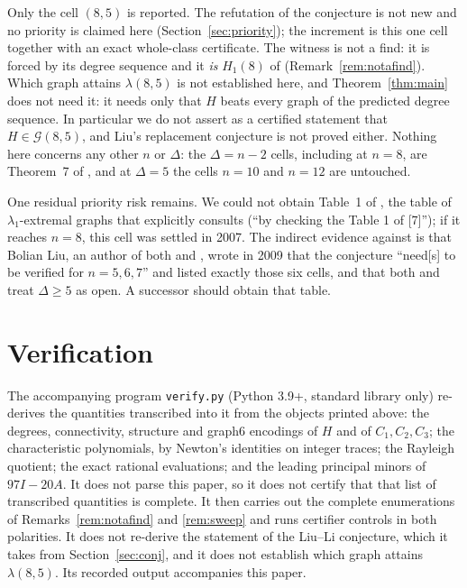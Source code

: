 \documentclass[11pt]{amsart}
\theoremstyle{definition}
\begin{document}
Only the cell $(8,5)$ is reported. The refutation of the conjecture is not new
and no priority is claimed here (Section~\ref{sec:priority}); the increment is
this one cell together with an exact whole-class certificate. The witness is not
a find: it is forced by its degree sequence and it \emph{is} $H_1(8)$ of
\cite{HLY} (Remark~\ref{rem:notafind}). Which graph attains $\lambda(8,5)$ is
not established here, and Theorem~\ref{thm:main} does not need it: it needs only
that $H$ beats every graph of the predicted degree sequence. In particular we do
not assert as a certified statement that $H\in\mathcal{G}(8,5)$, and Liu's
replacement conjecture is not proved either. Nothing here concerns any other $n$
or $\Delta$: the $\Delta=n-2$ cells, including at $n=8$, are Theorem~7 of
\cite{HLY}, and at $\Delta=5$ the cells $n=10$ and $n=12$ are untouched.

One residual priority risk remains. We could not obtain Table~1 of
\cite{LSW2007}, the table of $\lambda_1$-extremal graphs that \cite{LiuLi}
explicitly consults (``by checking the Table 1 of [7]''); if it reaches $n=8$,
this cell was settled in 2007. The indirect evidence against is that Bolian Liu,
an author of both \cite{LiuLi} and \cite{LHY2009}, wrote in 2009 that the
conjecture ``need[s] to be verified for $n=5,6,7$'' and listed exactly those six
cells, and that both \cite{Liu2024} and \cite{HLY} treat $\Delta\ge 5$ as open.
A successor should obtain that table.

\section*{Verification}

The accompanying program \texttt{verify.py} (Python 3.9+, standard library only)
re-derives the quantities transcribed into it from the objects printed above: the
degrees, connectivity, structure and graph6 encodings of $H$ and of
$C_1,C_2,C_3$; the characteristic polynomials, by Newton's identities on
integer traces; the Rayleigh quotient; the exact rational evaluations; and the
leading principal minors of $97I-20A$. It does not parse this paper, so it does
not certify that that list of transcribed quantities is complete. It then carries
out the complete enumerations of Remarks~\ref{rem:notafind} and \ref{rem:sweep}
and runs certifier controls in both polarities. It does not re-derive the
statement of the Liu--Li conjecture, which it takes from Section~\ref{sec:conj},
and it does not establish which graph attains $\lambda(8,5)$. Its recorded output
accompanies this paper.
\end{document}
